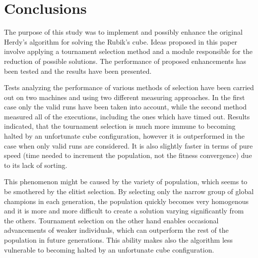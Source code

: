 \documentclass[a4paper]{article}
\begin{document}
\begin{table}[h]
\centering
\caption{Tournament selection}
\label{table:red_tournament_tests}
\end{table}

\section{Conclusions}

The purpose of this study was to implement and possibly enhance the original Herdy's algorithm for solving the Rubik's cube. Ideas proposed in this paper involve applying a tournament selection method and a module responsible for the reduction of possible solutions. The performance of proposed enhancements has been tested and the results have been presented.

Tests analyzing the performance of various methods of selection have been carried out on two machines and using two different measuring approaches. In the first case only the valid runs have been taken into account, while the second method measured all of the executions, including the ones which have timed out. Results indicated, that the tournament selection is much more immune to becoming halted by an unfortunate cube configuration, however it is outperformed in the case when only valid runs are considered. It is also slightly faster in terms of pure speed (time needed to increment the population, not the fitness convergence) due to its lack of sorting.

This phenomenon might be caused by the variety of population, which seems to be smothered by the elitist selection. By selecting only the narrow group of global champions in each generation, the population quickly becomes very homogenous and it is more and more difficult to create a solution varying significantly from the others. Tournament selection on the other hand enables occasional advancements of weaker individuals, which can outperform the rest of the population in future generations. This ability makes also the algorithm less vulnerable to becoming halted by an unfortunate cube configuration.
\end{document}
